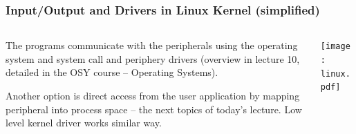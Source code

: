 \documentclass{beamer}
\begin{document}
\begin{frame}
\frametitle{Input/Output and Drivers in Linux Kernel (simplified)}
\begin{columns}
\begin{column}{0.4\textwidth}
The programs communicate with the peripherals using the operating system and system call and periphery drivers (overview in lecture 10, detailed in the OSY course -- Operating Systems).
\bigskip

Another option is direct access from the user application by mapping peripheral into process space -- the next topics of today's lecture. Low level kernel driver works similar way.
\end{column}
\begin{column}{0.58\textwidth}
\texttt{[image: linux.pdf]}
\end{column}
\end{columns}
\end{frame}
\end{document}
